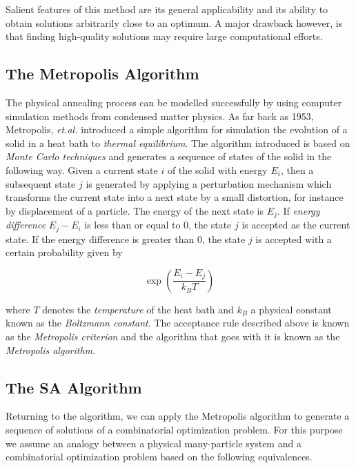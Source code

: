 \documentclass[11pt]{article}
\begin{document}
Salient features of this method are its general applicability and its
ability to obtain solutions arbitrarily close to an optimum. A major
drawback however, is that finding high-quality solutions may require
large computational efforts.

\subsection{The Metropolis Algorithm}\label{the-metropolis-algorithm}

The physical annealing process can be modelled successfully by using
computer simulation methods from condensed matter physics. As far back
as 1953, Metropolis, \emph{et.al.} introduced a simple algorithm for
simulation the evolution of a solid in a heat bath to \emph{thermal
equilibrium}. The algorithm introduced is based on \emph{Monte Carlo
techniques} and generates a sequence of states of the solid in the
following way. Given a current state \(i\) of the solid with energy
\(E_i\), then a subsequent state \(j\) is generated by applying a
perturbation mechanism which transforms the current state into a next
state by a small distortion, for instance by displacement of a particle.
The energy of the next state is \(E_j\). If \emph{energy difference}
\(E_j - E_i\) is less than or equal to 0, the state \(j\) is accepted as
the current state. If the energy difference is greater than 0, the state
\(j\) is accepted with a certain probability given by


\begin{equation}
\exp \left(  \dfrac{E_i-E_j}{k_B T} \right)
\end{equation}


where \(T\) denotes the \emph{temperature} of the heat bath and \(k_B\)
a physical constant known as the \emph{Boltzmann constant}. The
acceptance rule described above is known as the \emph{Metropolis
criterion} and the algorithm that goes with it is known as the
\emph{Metropolis algorithm}.

\subsection{The SA Algorithm}\label{the-sa-algorithm}

Returning to the algorithm, we can apply the Metropolis algorithm to
generate a sequence of solutions of a combinatorial optimization
problem. For this purpose we assume an analogy between a physical
many-particle system and a combinatorial optimization problem based on
the following equivalences.
\end{document}
